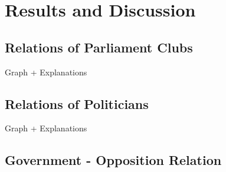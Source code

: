 \chapter{Results and Discussion}
\label{chap:evaluation}

\section{Relations of Parliament Clubs}
\label{sec:relations_clubs}
Graph + Explanations

\section{Relations of Politicians}
Graph + Explanations

\section{Government - Opposition Relation}